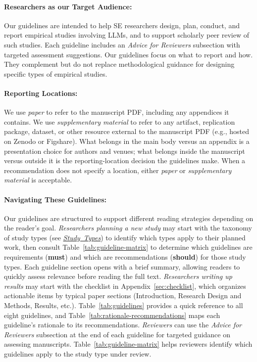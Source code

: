 \documentclass[smallextended]{svjour3}
\newif\ifpaper\papertrue
\newcommand{\must}{\textbf{must}\xspace}
\newcommand{\should}{\textbf{should}\xspace}
\newcommand{\paper}{\emph{paper}\xspace}
\newcommand{\supplementarymaterial}{\emph{supplementary material}\xspace}
\newcommand{\paper}{\emph{paper}\xspace}
\newcommand{\supplementarymaterial}{\emph{supplementary material}\xspace}
\newcommand{\studytypes}{\hyperref[sec:study-types]{\mbox{\emph{Study Types}}}\xspace}
\newcommand{\studytypes}{\href{/study-types/}{\emph{Study Types}}\xspace}
\newcommand{\scopeparagraph}[1]{\paragraph{\bfseries #1:}}
\newcommand{\scopeparagraph}[1]{\subsubsection{#1}}
\begin{document}
\scopeparagraph{Researchers as our Target Audience}

Our guidelines are intended to help SE researchers design, plan, conduct,
and report empirical studies involving LLMs, and to support scholarly peer
review of such studies. Each guideline includes an \emph{Advice for
Reviewers} subsection with targeted assessment suggestions.
Our guidelines focus on what to report and how. They complement but do not replace methodological guidance for designing specific types of empirical studies.

\scopeparagraph{Reporting Locations}

We use \paper to refer to the manuscript PDF, including any appendices it contains. We use \supplementarymaterial to refer to any artifact, replication package, dataset, or other resource external to the manuscript PDF (e.g., hosted on Zenodo or Figshare). What belongs in the main body versus an appendix is a presentation choice for authors and venues; what belongs inside the manuscript versus outside it is the reporting-location decision the guidelines make. When a recommendation does not specify a location, either \paper or \supplementarymaterial is acceptable.

\scopeparagraph{Navigating These Guidelines}

Our guidelines are structured to support different reading strategies depending on the reader's goal.
\emph{Researchers planning a new study} may start with the taxonomy of study types (see \studytypes) to identify which types apply to their planned work, then consult \ifpaper Table~\ref{tab:guideline-matrix} \else the \href{/guidelines/\#guidelines-by-study-type}{applicability matrix} \fi to determine which guidelines are requirements (\must) and which are recommendations (\should) for those study types. Each guideline section opens with a brief summary, allowing readers to quickly assess relevance before reading the full text.
\emph{Researchers writing up results} may start with the \ifpaper checklist in Appendix~\ref{sec:checklist}, \else \href{/checklist/}{checklist}, \fi which organizes actionable items by typical paper sections (Introduction, Research Design and Methods, Results, etc.). \ifpaper Table~\ref{tab:guidelines} provides a quick reference to all eight guidelines, and Table~\ref{tab:rationale-recommendations} maps each guideline's rationale to its recommendations. \fi
\emph{Reviewers} can use the \emph{Advice for Reviewers} subsection at the end of each guideline for targeted guidance on assessing manuscripts. \ifpaper Table~\ref{tab:guideline-matrix} helps reviewers identify which guidelines apply to the study type under review. \fi
\end{document}
